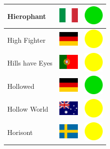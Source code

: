 \documentclass[12pt, a4paper, twoside]{report}
\begin{document}
\begin{center}
\begin{longtable}{|p{5cm}|p{2cm}|p{2cm}|}
			Hierophant & \includegraphics[width=1cm]{4x3/it} & \includegraphics[width=1cm]{likes/y} \\ \hline
			High Fighter & \includegraphics[width=1cm]{4x3/de} & \includegraphics[width=1cm]{likes/m} \\ \hline
			Hills have Eyes & \includegraphics[width=1cm]{4x3/pt} & \includegraphics[width=1cm]{likes/m} \\ \hline
			Hollowed & \includegraphics[width=1cm]{4x3/de} & \includegraphics[width=1cm]{likes/y} \\ \hline
			Hollow World & \includegraphics[width=1cm]{4x3/au} & \includegraphics[width=1cm]{likes/m} \\ \hline
			Horisont & \includegraphics[width=1cm]{4x3/se} & \includegraphics[width=1cm]{likes/m} \\ \hline

\end{longtable}
\end{center}
\end{document}
